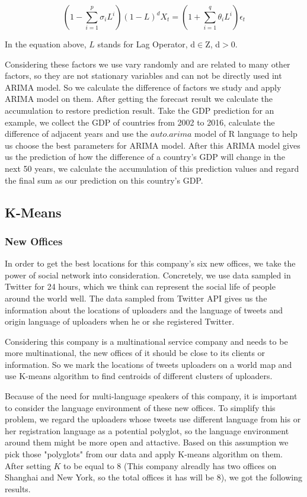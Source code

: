 \documentclass{mcmthesis}
\begin{document}
  \begin{equation}
    \left(1-\sum^p_{i=1}\sigma_i L^i\right)(1-L)^d X_t = \left(1+\sum^q_{i=1}\theta_i L^i\right)\epsilon_t
  \end{equation}

  \indent In the equation above, $L$ stands for Lag Operator, d$\in$Z, d$>$0.

  \indent Considering these factors we use vary randomly and are related to many other factors, so they are not stationary variables and can not be directly used int ARIMA model. So we calculate the difference of factors we study and apply ARIMA model on them. After getting the forecast result we calculate the accumulation to restore prediction result. Take the GDP prediction for an example, we collect the GDP of countries from 2002 to 2016, calculate the difference of adjacent years and use the $auto.arima$ model of R language to help us choose the best parameters for ARIMA model. After this ARIMA model gives us the prediction of how the difference of a country's GDP will change in the next 50 years, we calculate the accumulation of this prediction values and regard the final sum as our prediction on this country's GDP.

  \subsection{K-Means}

  \subsubsection{New Offices}

  \indent \indent In order to get the best locations for this company's six new offices, we take the power of social network into consideration. Concretely, we use data sampled in Twitter for 24 hours, which we think can represent the social life of people around the world well. The data sampled from Twitter API gives us the information about the locations of uploaders and the language of tweets and origin language of uploaders when he or she registered Twitter. 

  \indent Considering this company is a multinational service company and needs to be more multinational, the new offices of it should be close to its clients or information. So we mark the locations of tweets uploaders on a world map and use K-means algorithm to find centroids of different clusters of uploaders.
  
  \indent Because of the need for multi-language speakers of this company, it is important to consider the language environment of these new offices. To simplify this problem, we regard the uploaders whose tweets use different language from his or her registration language as a potential polyglot, so the language environment around them might be more open and attactive. Based on this assumption we pick those "polyglots" from our data and apply K-means algorithm on them. After setting $K$ to be equal to 8 (This company alreadly has two offices on Shanghai and New York, so the total offices it has will be 8), we got the following results.
\end{document}
